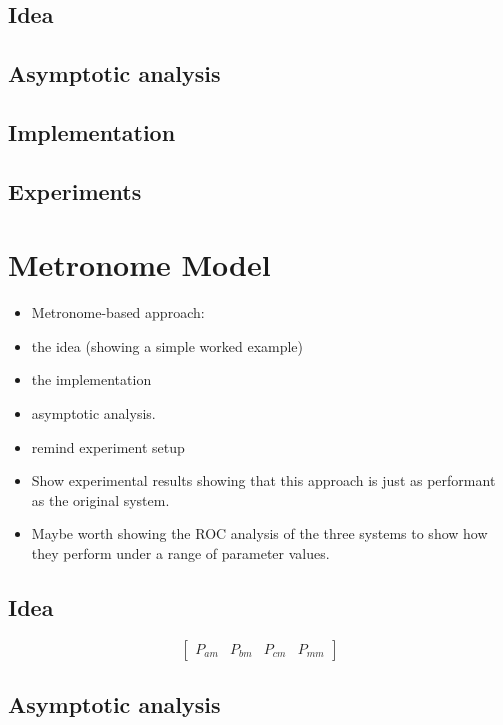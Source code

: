 \documentclass[11pt, a4paper]{report}
\begin{document}
\section{Idea}
\section{Asymptotic analysis}
\section{Implementation}
\section{Experiments}

\chapter{Metronome Model}
\label{cha:metronome-model}

\begin{itemize}
\item Metronome-based approach:
\item the idea (showing a simple worked
  example)
\item the implementation
\item asymptotic analysis.
\item remind experiment setup
\item Show experimental results showing that this approach is just as
  performant as the original system.
\item Maybe worth showing the ROC analysis of the three systems to show
  how they perform under a range of parameter values.
\end{itemize}

\section{Idea}

%
%
\[
\begin{bmatrix}
  P_{am} & P_{bm} & P_{cm} & P_{mm}
\end{bmatrix}
\]

\section{Asymptotic analysis}
\end{document}
